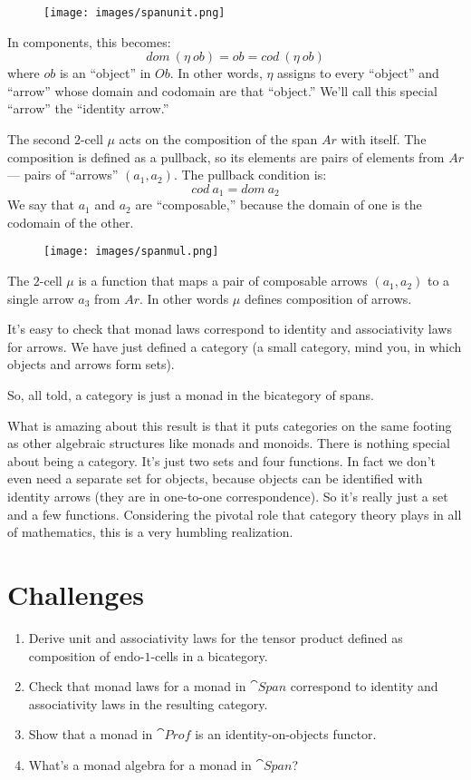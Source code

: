 \begin{figure}[H]
\centering
\texttt{[image: images/spanunit.png]}
\end{figure}

\noindent
In components, this becomes:
\[dom\ (\eta\ ob) = ob = cod\ (\eta\ ob)\]
where $ob$ is an ``object'' in $Ob$. In other words,
$\eta$ assigns to every ``object'' and ``arrow'' whose domain and
codomain are that ``object.'' We'll call this special ``arrow'' the
``identity arrow.''

The second $2$-cell $\mu$ acts on the composition of the span
$Ar$ with itself. The composition is defined as a pullback, so
its elements are pairs of elements from $Ar$ --- pairs of
``arrows'' $(a_1, a_2)$. The pullback condition is:
\[cod\ a_1 = dom\ a_2\]
We say that $a_1$ and $a_2$ are ``composable,'' because the
domain of one is the codomain of the other.

\begin{figure}[H]
\centering
\texttt{[image: images/spanmul.png]}
\end{figure}

\noindent
The $2$-cell $\mu$ is a function that maps a pair of composable
arrows $(a_1, a_2)$ to a single arrow $a_3$ from
$Ar$. In other words $\mu$ defines composition of arrows.

It's easy to check that monad laws correspond to identity and
associativity laws for arrows. We have just defined a category (a small
category, mind you, in which objects and arrows form sets).

So, all told, a category is just a monad in the bicategory of spans.

What is amazing about this result is that it puts categories on the same
footing as other algebraic structures like monads and monoids. There is
nothing special about being a category. It's just two sets and four
functions. In fact we don't even need a separate set for objects,
because objects can be identified with identity arrows (they are in
one-to-one correspondence). So it's really just a set and a few
functions. Considering the pivotal role that category theory plays in
all of mathematics, this is a very humbling realization.

\section{Challenges}

\begin{enumerate}
\tightlist
\item
  Derive unit and associativity laws for the tensor product defined as
  composition of endo-$1$-cells in a bicategory.
\item
  Check that monad laws for a monad in $\cat{Span}$ correspond to
  identity and associativity laws in the resulting category.
\item
  Show that a monad in $\cat{Prof}$ is an identity-on-objects functor.
\item
  What's a monad algebra for a monad in $\cat{Span}$?
\end{enumerate}


